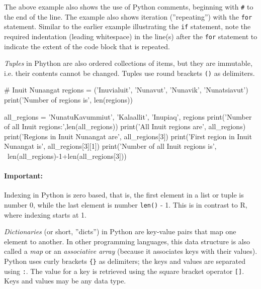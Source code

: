 \noindent The above example also shows the use of Python comments, beginning with \texttt{\#} to the end of the line. The example also shows iteration (''repeating'') with the \texttt{for} statement. Similar to the earlier example illustrating the \texttt{if} statement, note the required indentation (leading whitespace) in the line(s) after the \texttt{for} statement to indicate the extent of the code block that is repeated.

\emph{Tuples} in Phython are also ordered collections of items, but they are immutable, i.e. their contents cannot be changed. Tuples use round brackets \texttt{()} as delimiters.

\begin{samepage}
\begin{pythoncode}
# Inuit Nunangat
regions = ('Inuvialuit', 'Nunavut', 'Nunavik', 'Nunatsiavut')
print('Number of regions is', len(regions))

all_regions = 'NunatuKavummiut', 'Kalaallit', 'Inupiaq', regions
print('Number of all Inuit regions:',len(all_regions))
print('All Inuit regions are', all_regions)
print('Regions in Inuit Nunangat are', all_regions[3])
print('First region in Inuit Nunangat is', all_regions[3][1])
print('Number of all Inuit regions is', \
    len(all_regions)-1+len(all_regions[3]))
\end{pythoncode}
\end{samepage}

\begin{tcolorbox}[colback=alert]
\paragraph*{Important:} Indexing in Python is zero based, that is, the first element in a list or tuple is number 0, while the last element is number \texttt{len()} - 1. This is in contrast to R, where indexing starts at 1.
\end{tcolorbox}

\emph{Dictionaries} (or short, ''dicts'') in Python are key-value pairs that map one element to another. In other programming languages, this data structure is also called a \emph{map} or an \emph{associative array} (because it associates keys with their values). Python uses curly brackets \texttt{\{\}} as delimiters; the keys and values are separated using \texttt{:}. The value for a key is retrieved using the square bracket operator \texttt{[]}. Keys and values may be any data type.


